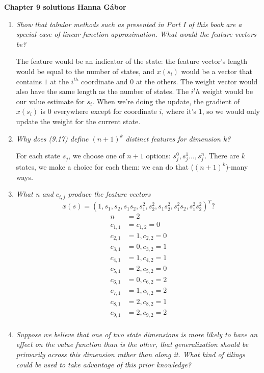 \documentclass[12pt,a4paper]{article}
\begin{document}
\textbf{Chapter 9 solutions  \hfill Hanna Gábor}

\begin{enumerate}
  \item \textit{Show that tabular methods such as presented in Part I of this book are a
    special case of linear function approximation. What would the feature vectors be?}
    
    The feature would be an indicator of the state: the feature vector's length would be
    equal to the number of states, and $x(s_i)$ would be a vector that contains $1$ at
    the $i^{th}$ coordinate and $0$ at the others. The weight vector would also have
    the same length as the number of states. The $i^th$ weight would be our value estimate
    for $s_i$. When we're doing the update, the gradient of $x(s_i)$ is $0$ everywhere except
    for coordinate $i$, where it's $1$, so we would only update the weight for the current state.
    
  \item \textit{Why does (9.17) define $(n + 1)^k$ distinct features for dimension $k$?}
    
    For each state $s_j$, we choose one of $n + 1$ options: $s_j^0, s_j^1 \dots, s_j^n$.
    There are $k$ states, we make a choice for each them: we can do that ($(n + 1)^k$)-many
    ways.

  \item \textit{What n and $c_{i,j}$ produce the feature vectors
    \[x(s) = (1, s_1, s_2, s_1s_2, s_1^2, s_2^2, s_1s_2^2, s_1^2s_2, s_1^2s_2^2)^T?\]}
    \vspace{-1cm}
    \begin{align*}
    n &= 2 \\
    c_{1, 1} &= c_{1, 2} = 0\\
    c_{2, 1} &= 1, c_{2, 2} = 0\\
    c_{3, 1} &= 0, c_{3, 2} = 1\\
    c_{4, 1} &= 1, c_{4, 2} = 1\\
    c_{5, 1} &= 2, c_{5, 2} = 0\\
    c_{6, 1} &= 0, c_{6, 2} = 2\\
    c_{7, 1} &= 1, c_{7, 2} = 2\\
    c_{8, 1} &= 2, c_{8, 2} = 1\\
    c_{9, 1} &= 2, c_{9, 2} = 2\\
    \end{align*}
  
  \item \textit{Suppose we believe that one of two state dimensions is more likely to have
  an effect on the value function than is the other, that generalization should be primarily
  across this dimension rather than along it. What kind of tilings could be used to take
  advantage of this prior knowledge?}


\end{enumerate}
\end{document}
